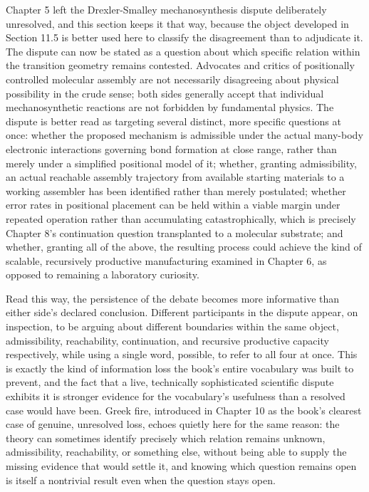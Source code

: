 \documentclass[11pt]{book}
\begin{document}
Chapter 5 left the Drexler-Smalley mechanosynthesis dispute deliberately unresolved, and this section keeps it that way, because the object developed in Section 11.5 is better used here to classify the disagreement than to adjudicate it. The dispute can now be stated as a question about which specific relation within the transition geometry remains contested. Advocates and critics of positionally controlled molecular assembly are not necessarily disagreeing about physical possibility in the crude sense; both sides generally accept that individual mechanosynthetic reactions are not forbidden by fundamental physics. The dispute is better read as targeting several distinct, more specific questions at once: whether the proposed mechanism is admissible under the actual many-body electronic interactions governing bond formation at close range, rather than merely under a simplified positional model of it; whether, granting admissibility, an actual reachable assembly trajectory from available starting materials to a working assembler has been identified rather than merely postulated; whether error rates in positional placement can be held within a viable margin under repeated operation rather than accumulating catastrophically, which is precisely Chapter 8's continuation question transplanted to a molecular substrate; and whether, granting all of the above, the resulting process could achieve the kind of scalable, recursively productive manufacturing examined in Chapter 6, as opposed to remaining a laboratory curiosity.

Read this way, the persistence of the debate becomes more informative than either side's declared conclusion. Different participants in the dispute appear, on inspection, to be arguing about different boundaries within the same object, admissibility, reachability, continuation, and recursive productive capacity respectively, while using a single word, possible, to refer to all four at once. This is exactly the kind of information loss the book's entire vocabulary was built to prevent, and the fact that a live, technically sophisticated scientific dispute exhibits it is stronger evidence for the vocabulary's usefulness than a resolved case would have been. Greek fire, introduced in Chapter 10 as the book's clearest case of genuine, unresolved loss, echoes quietly here for the same reason: the theory can sometimes identify precisely which relation remains unknown, admissibility, reachability, or something else, without being able to supply the missing evidence that would settle it, and knowing which question remains open is itself a nontrivial result even when the question stays open.
\end{document}
